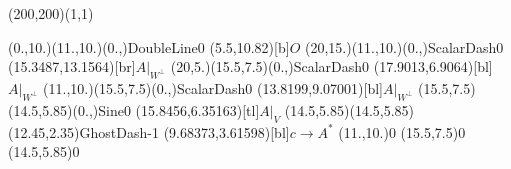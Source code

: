 \unitlength=1bp%

\begin{feynartspicture}(200,200)(1,1)

\FADiagram{}
\FAProp(0.,10.)(11.,10.)(0.,){DoubleLine}{0}
\FALabel(5.5,10.82)[b]{$O$}
\FAProp(20,15.)(11.,10.)(0.,){ScalarDash}{0}
\FALabel(15.3487,13.1564)[br]{$A|_{W^\perp}$}
\FAProp(20,5.)(15.5,7.5)(0.,){ScalarDash}{0}
\FALabel(17.9013,6.9064)[bl]{$A|_{W^\perp}$}
\FAProp(11.,10.)(15.5,7.5)(0.,){ScalarDash}{0}
\FALabel(13.8199,9.07001)[bl]{$A|_{W^\perp}$}
\FAProp(15.5,7.5)(14.5,5.85)(0.,){Sine}{0}
\FALabel(15.8456,6.35163)[tl]{$A|_V$}
\FAProp(14.5,5.85)(14.5,5.85)(12.45,2.35){GhostDash}{-1}
\FALabel(9.68373,3.61598)[bl]{$c\to A^*$}
\FAVert(11.,10.){0}
\FAVert(15.5,7.5){0}
\FAVert(14.5,5.85){0}
\end{feynartspicture}

